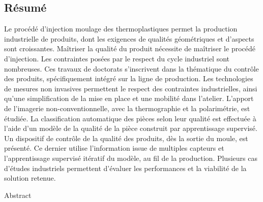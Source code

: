 {}

\vspace*{-1cm}
\begin{flushright}
\section*{\fontsize{20pt}{20pt}\selectfont\textnormal{Résumé}}
\end{flushright}

\fancyhf{}
\lfoot[\fancyplain{}{}]
{\fancyplain{}{}}
\cfoot[\fancyplain{}{\thepage}]
{\fancyplain{}{\thepage}}
\rfoot[\fancyplain{}{}]
{\fancyplain{}{\scriptsize}}

Le procédé d'injection moulage des thermoplastiques permet la production industrielle de produits, dont les exigences de qualités géométriques et d'aspects sont croissantes. Maîtriser la qualité du produit nécessite de maîtriser le procédé d'injection. Les contraintes posées par le respect du cycle industriel sont nombreuses. Ces travaux de doctorats s'inscrivent dans la thématique du contrôle des produits, spécifiquement intégré sur la ligne de production. Les technologies de mesures non invasives permettent le respect des contraintes industrielles, ainsi qu'une simplification de la mise en place et une mobilité dans l'atelier. L'apport de l'imagerie non-conventionnelle, avec la thermographie et la polarimétrie, est étudiée. La classification automatique des pièces selon leur qualité est effectuée à l'aide d'un modèle de la qualité de la pièce construit par apprentissage supervisé. Un dispositif de contrôle de la qualité des produits, dès la sortie du moule, est présenté. Ce dernier utilise l'information issue de multiples capteurs et l'apprentissage supervisé itératif du modèle, au fil de la production. Plusieurs cas d'études industriels permettent d'évaluer les performances et la viabilité de la solution retenue.

\vspace*{3cm}
\begin{flushright}
	\fontsize{20pt}{20pt}\selectfont\textnormal{Abstract}
\end{flushright}

